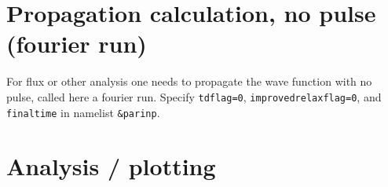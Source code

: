 \documentclass[10pt,leqno, oneside]{book}
\begin{document}
%
        




\section{Propagation calculation, no pulse (fourier run)}

For flux or other analysis one needs to propagate the wave function with no pulse, called here a fourier run.
Specify \verb#tdflag=0#, \verb#improvedrelaxflag=0#, and \verb#finaltime# in namelist \verb#&parinp#.

\section{Analysis / plotting}
\end{document}
